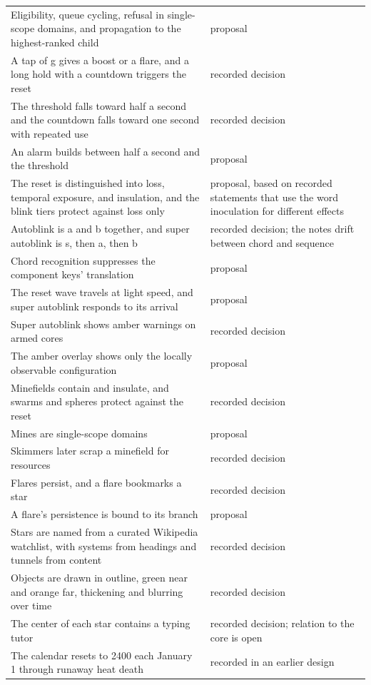 \documentclass[11pt]{article}
\begin{document}
\begin{longtable}{@{}p{9.4cm}p{3.1cm}@{}}
Eligibility, queue cycling, refusal in single-scope domains, and propagation to the highest-ranked child & proposal \\
A tap of g gives a boost or a flare, and a long hold with a countdown triggers the reset & recorded decision \\
The threshold falls toward half a second and the countdown falls toward one second with repeated use & recorded decision \\
An alarm builds between half a second and the threshold & proposal \\
The reset is distinguished into loss, temporal exposure, and insulation, and the blink tiers protect against loss only & proposal, based on recorded statements that use the word inoculation for different effects \\
Autoblink is a and b together, and super autoblink is s, then a, then b & recorded decision; the notes drift between chord and sequence \\
Chord recognition suppresses the component keys' translation & proposal \\
The reset wave travels at light speed, and super autoblink responds to its arrival & proposal \\
Super autoblink shows amber warnings on armed cores & recorded decision \\
The amber overlay shows only the locally observable configuration & proposal \\
Minefields contain and insulate, and swarms and spheres protect against the reset & recorded decision \\
Mines are single-scope domains & proposal \\
Skimmers later scrap a minefield for resources & recorded decision \\
Flares persist, and a flare bookmarks a star & recorded decision \\
A flare's persistence is bound to its branch & proposal \\
Stars are named from a curated Wikipedia watchlist, with systems from headings and tunnels from content & recorded decision \\
Objects are drawn in outline, green near and orange far, thickening and blurring over time & recorded decision \\
The center of each star contains a typing tutor & recorded decision; relation to the core is open \\
The calendar resets to 2400 each January 1 through runaway heat death & recorded in an earlier design \\

\end{longtable}
\end{document}
